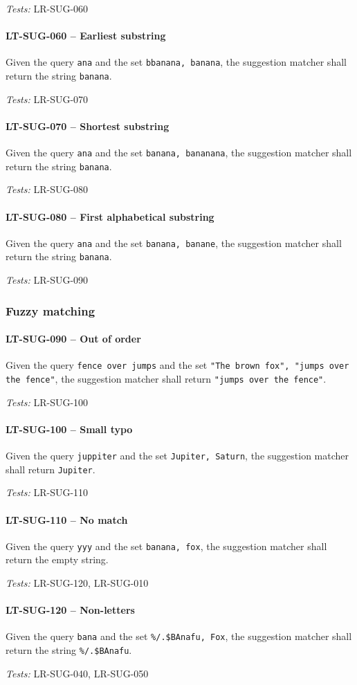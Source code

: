 \textit{Tests: } LR-SUG-060

\paragraph{LT-SUG-060 -- Earliest substring}
Given the query \lstinline{ana} and the set \lstinline{bbanana, banana},
the suggestion matcher shall return the string \lstinline{banana}.

\textit{Tests: } LR-SUG-070

\paragraph{LT-SUG-070 -- Shortest substring}
Given the query \lstinline{ana} and the set \lstinline{banana, bananana},
the suggestion matcher shall return the string \lstinline{banana}.

\textit{Tests: } LR-SUG-080

\paragraph{LT-SUG-080 -- First alphabetical substring}
Given the query \lstinline{ana} and the set \lstinline{banana, banane},
the suggestion matcher shall return the string \lstinline{banana}.

\textit{Tests: } LR-SUG-090

\subsubsection{Fuzzy matching}
\paragraph{LT-SUG-090 -- Out of order}
Given the query \lstinline{fence over jumps} and the set
\lstinline{"The brown fox", "jumps over the fence"}, the suggestion
matcher shall return \lstinline{"jumps over the fence"}.

\textit{Tests: } LR-SUG-100

\paragraph{LT-SUG-100 -- Small typo}
Given the query \lstinline{juppiter} and the set
\lstinline{Jupiter, Saturn}, the suggestion matcher shall return
\lstinline{Jupiter}.

\textit{Tests: } LR-SUG-110

\paragraph{LT-SUG-110 -- No match}
Given the query \lstinline{yyy} and the set
\lstinline{banana, fox}, the suggestion matcher shall return the
empty string.

\textit{Tests: } LR-SUG-120, LR-SUG-010

\paragraph{LT-SUG-120 -- Non-letters}
Given the query \lstinline{bana} and the set
\lstinline{%/.$BAnafu, Fox}, the suggestion matcher shall return
the string \lstinline{%/.$BAnafu}.

\textit{Tests: } LR-SUG-040, LR-SUG-050
